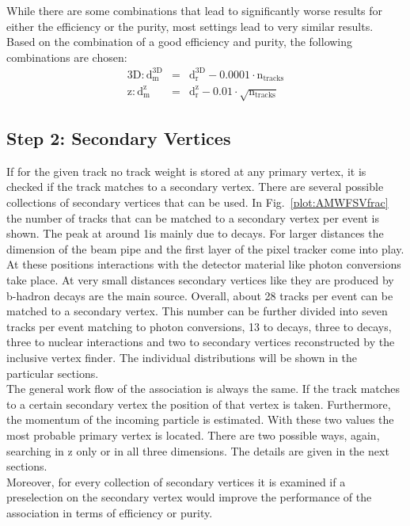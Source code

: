 While there are some combinations that lead to significantly worse results for either the efficiency or the purity, most settings lead to very similar results. Based on the combination of a good efficiency and purity, the following combinations are chosen:
\begin{eqnarray}
    \textrm{3D}: \textrm{d}_{\textrm{m}}^{\textrm{3D}} & = & \textrm{d}_{\textrm{r}}^{\textrm{3D}}- 0.0001 \cdot \textrm{n}_{\textrm{tracks}} \label{eqn:AMWFCVweight3} \\
    \textrm{z}:\textrm{d}_{\textrm{m}}^{\textrm{z}} & = & \textrm{d}_{\textrm{r}}^{\textrm{z}}- 0.01 \cdot \sqrt{\textrm{n}_{\textrm{tracks}}} \label{eqn:AMWFCVweightz}
\end{eqnarray}

\subsection{Step 2: Secondary Vertices\label{sec:AMWFSV}}

If for the given track no track weight is stored at any primary vertex, it is checked if the track matches to a secondary vertex. There are several possible collections of secondary vertices that can be used. In Fig.~\ref{plot:AMWFSVfrac} the number of tracks that can be matched to a secondary vertex per event is shown. The peak at around 1\cm is mainly due to \PKzS{} decays. For larger distances the dimension of the beam pipe and the first layer of the pixel tracker come into play.  At these positions interactions with the detector material like photon conversions take place. At very small distances secondary vertices like they are produced by b-hadron decays are the main source. Overall, about 28 tracks per event can be matched to a secondary vertex. This number can be further divided into seven tracks per event matching to photon conversions, 13 to \PKzS{} decays, three to \PgL{} decays, three to nuclear interactions and two to secondary vertices reconstructed by the inclusive vertex finder. The individual distributions will be shown in the particular sections.  \\
The general work flow of the association is always the same. If the track matches to a certain secondary vertex the position of that vertex is taken. Furthermore, the momentum of the incoming particle is estimated. With these two values the most probable primary vertex is located. There are two possible ways, again, searching in z only or in all three dimensions. The details are given in the next sections. \\
Moreover, for every collection of secondary vertices it is examined if a preselection on the secondary vertex would improve the performance of the association in terms of efficiency or purity.

